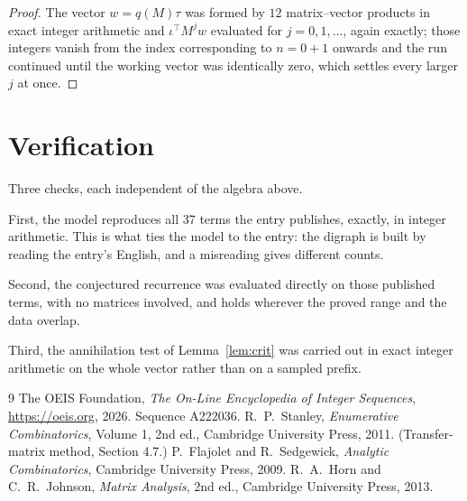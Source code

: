 \documentclass[11pt,a4paper]{article}
\theoremstyle{plain}
\theoremstyle{definition}
\begin{document}
\begin{proof}
The vector $w=q(M)\tau$ was formed by $12$ matrix--vector products in exact integer
arithmetic and $\iota^{\!\top}M^{j}w$ evaluated for $j=0,1,\dots$, again exactly; those
integers vanish from the index corresponding to $n=0+1$ onwards and the run continued
until the working vector was identically zero, which settles every larger $j$ at once.
\end{proof}

\section{Verification}

Three checks, each independent of the algebra above.

First, the model reproduces all $37$ terms the entry publishes, exactly, in integer
arithmetic. This is what ties the model to the entry: the digraph is built by reading the
entry's English, and a misreading gives different counts.

Second, the conjectured recurrence was evaluated directly on those published terms, with no
matrices involved, and holds wherever the proved range and the data overlap.

Third, the annihilation test of Lemma~\ref{lem:crit} was carried out in exact integer
arithmetic on the whole vector rather than on a sampled prefix.

\begin{thebibliography}{9}
 The OEIS Foundation, \emph{The On-Line Encyclopedia of Integer
Sequences}, \url{https://oeis.org}, 2026. Sequence A222036.
 R.~P.~Stanley, \emph{Enumerative Combinatorics}, Volume 1, 2nd ed.,
Cambridge University Press, 2011. (Transfer-matrix method, Section 4.7.)
 P.~Flajolet and R.~Sedgewick, \emph{Analytic Combinatorics}, Cambridge
University Press, 2009.
 R.~A.~Horn and C.~R.~Johnson, \emph{Matrix Analysis}, 2nd ed., Cambridge
University Press, 2013.
\end{thebibliography}
\end{document}
